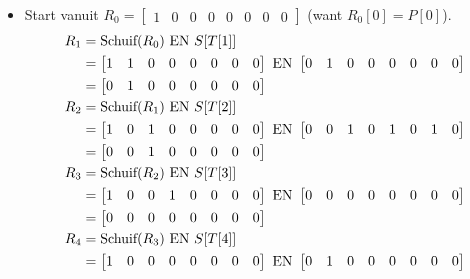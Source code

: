 \begin{itemize}
\begin{itemize}
\begin{table}[ht]
{\begin{tabular}{|c c | c c c c c c c c c c c c c c c c c c c c c c c c |}
                \hline
            \end{tabular}
            }
        \end{table}
        \begin{itemize}
            \item Start vanuit $R_0 = \begin{bmatrix}1&0&0&0&0&0&0&0\end{bmatrix}$ (want $R_0[0] = P[0]$).
            \begin{align*}
                R_{1} & = \hbox{Schuif}(R_0) \hbox{ EN } S[T[1]] \\
            & = \begin{bmatrix}1& 1& 0& 0& 0& 0& 0& 0\end{bmatrix} \hbox{ EN } \begin{bmatrix}0&1&0&0&0&0&0&0\end{bmatrix} \\
                      & = \begin{bmatrix}0&1&0&0&0&0&0&0\end{bmatrix} \\
                R_{2} & = \hbox{Schuif}(R_1) \hbox{ EN } S[T[2]] \\
                      & = \begin{bmatrix}1&0&1&0&0&0&0&0\end{bmatrix} \hbox{ EN } \begin{bmatrix}0&0&1&0&1&0&1&0\end{bmatrix} \\
                      & = \begin{bmatrix}0&0&1&0&0&0&0&0\end{bmatrix}\\
                R_{3} & = \hbox{Schuif}(R_2) \hbox{ EN } S[T[3]] \\
                      & = \begin{bmatrix}1&0&0&1&0&0&0&0\end{bmatrix} \hbox{ EN } \begin{bmatrix}0&0&0&0&0&0&0&0\end{bmatrix} \\
                      & = \begin{bmatrix}0&0&0&0&0&0&0&0\end{bmatrix} \\
                R_{4} & = \hbox{Schuif}(R_3) \hbox{ EN } S[T[4]] \\
                      & = \begin{bmatrix}1&0&0&0&0&0&0&0\end{bmatrix} \hbox{ EN } \begin{bmatrix}0&1&0&0&0&0&0&0\end{bmatrix} \\

\end{align*}
\end{itemize}
\end{itemize}
\end{itemize}
